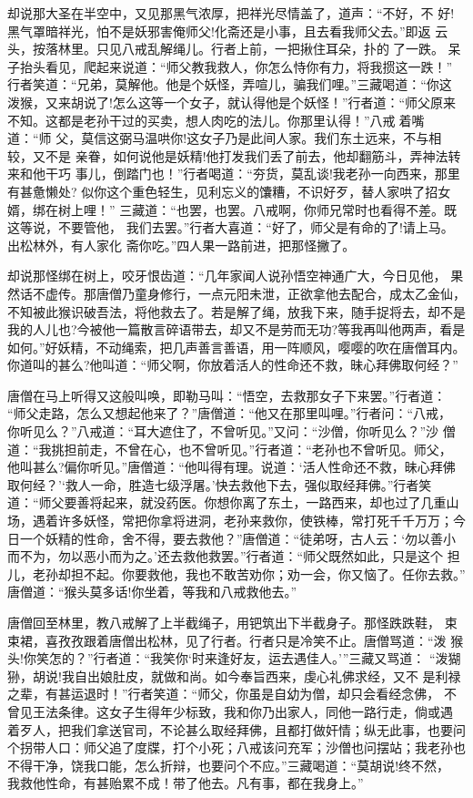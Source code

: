 却说那大圣在半空中，又见那黑气浓厚，把祥光尽情盖了，道声：“不好，不
好!黑气罩暗祥光，怕不是妖邪害俺师父!化斋还是小事，且去看我师父去。”即返
云头，按落林里。只见八戒乱解绳儿。行者上前，一把揪住耳朵，扑的了一跌。
呆子抬头看见，爬起来说道：“师父教我救人，你怎么恃你有力，将我掼这一跌！”
行者笑道：“兄弟，莫解他。他是个妖怪，弄喧儿，骗我们哩。”三藏喝道：“你这
泼猴，又来胡说了!怎么这等一个女子，就认得他是个妖怪！”行者道：“师父原来
不知。这都是老孙干过的买卖，想人肉吃的法儿。你那里认得！”八戒着嘴道：“师
父，莫信这弼马温哄你!这女子乃是此间人家。我们东土远来，不与相较，又不是
亲眷，如何说他是妖精!他打发我们丢了前去，他却翻筋斗，弄神法转来和他干巧
事儿，倒踏门也！”行者喝道：“夯货，莫乱谈!我老孙一向西来，那里有甚惫懒处?
似你这个重色轻生，见利忘义的馕糟，不识好歹，替人家哄了招女婿，绑在树上哩！”
三藏道：“也罢，也罢。八戒啊，你师兄常时也看得不差。既这等说，不要管他，
我们去罢。”行者大喜道：“好了，师父是有命的了!请上马。出松林外，有人家化
斋你吃。”四人果一路前进，把那怪撇了。

却说那怪绑在树上，咬牙恨齿道：“几年家闻人说孙悟空神通广大，今日见他，
果然话不虚传。那唐僧乃童身修行，一点元阳未泄，正欲拿他去配合，成太乙金仙，
不知被此猴识破吾法，将他救去了。若是解了绳，放我下来，随手捉将去，却不是
我的人儿也?今被他一篇散言碎语带去，却又不是劳而无功?等我再叫他两声，看是
如何。”好妖精，不动绳索，把几声善言善语，用一阵顺风，嘤嘤的吹在唐僧耳内。
你道叫的甚么?他叫道：“师父啊，你放着活人的性命还不救，昧心拜佛取何经？”

唐僧在马上听得又这般叫唤，即勒马叫：“悟空，去救那女子下来罢。”行者道：
“师父走路，怎么又想起他来了？”唐僧道：“他又在那里叫哩。”行者问：“八戒，
你听见么？”八戒道：“耳大遮住了，不曾听见。”又问：“沙僧，你听见么？”沙
僧道：“我挑担前走，不曾在心，也不曾听见。”行者道：“老孙也不曾听见。师父，
他叫甚么?偏你听见。”唐僧道：“他叫得有理。说道：‘活人性命还不救，昧心拜佛
取何经？’‘救人一命，胜造七级浮屠。’快去救他下去，强似取经拜佛。”行者笑
道：“师父要善将起来，就没药医。你想你离了东土，一路西来，却也过了几重山
场，遇着许多妖怪，常把你拿将进洞，老孙来救你，使铁棒，常打死千千万万；今
日一个妖精的性命，舍不得，要去救他？”唐僧道：“徒弟呀，古人云：‘勿以善小
而不为，勿以恶小而为之。’还去救他救罢。”行者道：“师父既然如此，只是这个
担儿，老孙却担不起。你要救他，我也不敢苦劝你；劝一会，你又恼了。任你去救。”
唐僧道：“猴头莫多话!你坐着，等我和八戒救他去。”

唐僧回至林里，教八戒解了上半截绳子，用钯筑出下半截身子。那怪跌跌鞋，
束束裙，喜孜孜跟着唐僧出松林，见了行者。行者只是冷笑不止。唐僧骂道：“泼
猴头!你笑怎的？”行者道：“我笑你‘时来逢好友，运去遇佳人。’”三藏又骂道：
“泼猢狲，胡说!我自出娘肚皮，就做和尚。如今奉旨西来，虔心礼佛求经，又不
是利禄之辈，有甚运退时！”行者笑道：“师父，你虽是自幼为僧，却只会看经念佛，
不曾见王法条律。这女子生得年少标致，我和你乃出家人，同他一路行走，倘或遇
着歹人，把我们拿送官司，不论甚么取经拜佛，且都打做奸情；纵无此事，也要问
个拐带人口：师父追了度牒，打个小死；八戒该问充军；沙僧也问摆站；我老孙也
不得干净，饶我口能，怎么折辩，也要问个不应。”三藏喝道：“莫胡说!终不然，
我救他性命，有甚贻累不成！带了他去。凡有事，都在我身上。”

